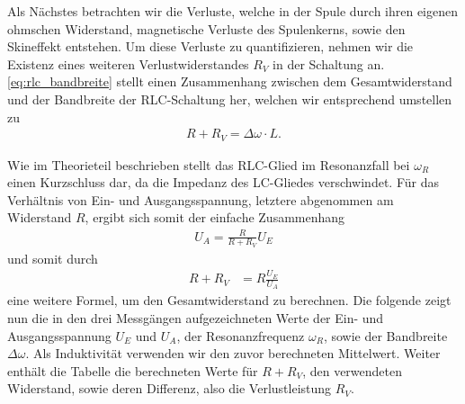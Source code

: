 Als Nächstes betrachten wir die Verluste, welche in der Spule durch ihren eigenen ohmschen Widerstand, magnetische Verluste des Spulenkerns, sowie den Skineffekt entstehen. Um diese Verluste zu quantifizieren, nehmen wir die Existenz eines weiteren Verlustwiderstandes $R_V$ in der Schaltung an. \eqref{eq:rlc_bandbreite} stellt einen Zusammenhang zwischen dem Gesamtwiderstand und der Bandbreite der RLC-Schaltung her, welchen wir entsprechend umstellen zu
\begin{align}
  R + R_V = \Delta \omega \cdot L.
\end{align}

Wie im Theorieteil beschrieben stellt das RLC-Glied im Resonanzfall bei $\omega_R$ einen Kurzschluss dar, da die Impedanz des LC-Gliedes verschwindet. Für das Verhältnis von Ein- und Ausgangsspannung, letztere abgenommen am Widerstand $R$, ergibt sich somit der einfache Zusammenhang
\begin{align}
  U_A = \frac{R}{R + R_V} U_E
\end{align}
und somit durch
\begin{align}
  R + R_V &= R \frac{U_E}{U_A}
\end{align}
eine weitere Formel, um den Gesamtwiderstand zu berechnen. Die folgende  zeigt nun die in den drei Messgängen aufgezeichneten Werte der Ein- und Ausgangsspannung $U_E$ und $U_A$, der Resonanzfrequenz $\omega_R$, sowie der Bandbreite $\Delta \omega$. Als Induktivität verwenden wir den zuvor berechneten Mittelwert. Weiter enthält die Tabelle die berechneten Werte für $R + R_V$, den verwendeten Widerstand, sowie deren Differenz, also die Verlustleistung $R_V$.

